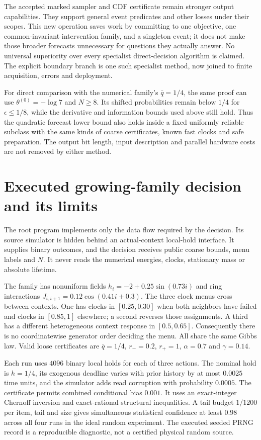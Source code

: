The accepted marked sampler and CDF certificate remain stronger output capabilities. They support general event predicates and other losses under their scopes. This new operation saves work by committing to one objective, one common-invariant intervention family, and a singleton event; it does not make those broader forecasts unnecessary for questions they actually answer. No universal superiority over every specialist direct-decision algorithm is claimed. The explicit boundary branch is one such specialist method, now joined to finite acquisition, errors and deployment.



For direct comparison with the numerical family's $\bar q=1/4$, the same proof can use $\theta^{(0)}=-\log7$ and $N\ge8$. Its shifted probabilities remain below $1/4$ for $\epsilon\le1/8$, while the derivative and information bounds used above still hold. Thus the quadratic forecast lower bound also holds inside a fixed uniformly reliable subclass with the same kinds of coarse certificates, known fast clocks and safe preparation. The output bit length, input description and parallel hardware costs are not removed by either method.

\section{Executed growing-family decision and its limits}
\label{sec:execution}
The root program implements only the data flow required by the decision. Its source simulator is hidden behind an actual-context local-hold interface. It supplies binary outcomes, and the decision receives public coarse bounds, menu labels and $N$. It never reads the numerical energies, clocks, stationary mass or absolute lifetime.

The family has nonuniform fields $h_i=-2+0.25\sin(0.73i)$ and ring interactions $J_{i,i+1}=0.12\cos(0.41i+0.3)$. The three clock menus cross between contexts. One has clocks in $[0.25,0.30]$ when both neighbors have failed and clocks in $[0.85,1]$ elsewhere; a second reverses those assignments. A third has a different heterogeneous context response in $[0.5,0.65]$. Consequently there is no coordinatewise generator order deciding the menu. All share the same Gibbs law. Valid loose certificates are $\bar q=1/4$, $r_-=0.2$, $r_+=1$, $\alpha=0.7$ and $\gamma=0.14$.

Each run uses $4096$ binary local holds for each of three actions. The nominal hold is $h=1/4$, its exogenous deadline varies with prior history by at most $0.0025$ time units, and the simulator adds read corruption with probability $0.0005$. The certificate permits combined conditional bias $0.001$. It uses an exact-integer Chernoff inversion and exact-rational structural inequalities. A tail budget $1/1200$ per item, tail and size gives simultaneous statistical confidence at least $0.98$ across all four runs in the ideal random experiment. The executed seeded PRNG record is a reproducible diagnostic, not a certified physical random source.

